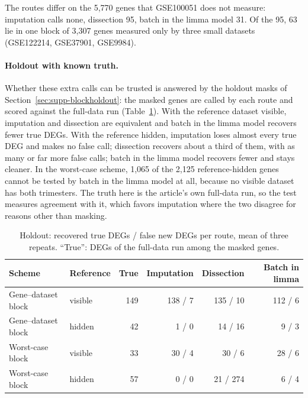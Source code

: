 \documentclass[11pt,a4paper]{article}
\begin{document}
The routes differ on the 5{,}770 genes that GSE100051 does not
measure: imputation calls none, dissection 95, batch in the limma
model 31. Of the 95, 63 lie in one block of 3{,}307 genes measured
only by three small datasets (GSE122214, GSE37901, GSE9984).

\paragraph{Holdout with known truth.}
Whether these extra calls can be trusted is answered by the
holdout masks of Section~\ref{sec:supp-blockholdout}: the masked
genes are called by each route and scored against the full-data
run (Table~\ref{tab:supp-routes-holdout}). With the reference
dataset visible, imputation and dissection are equivalent and
batch in the limma model recovers fewer true DEGs. With the
reference hidden, imputation loses almost every true DEG and makes
no false call; dissection recovers about a third of them, with as
many or far more false calls; batch in the limma model recovers
fewer and stays cleaner. In the worst-case scheme, 1{,}065 of the
2{,}125 reference-hidden genes cannot be tested by batch in the
limma model at all, because no visible dataset has both
trimesters. The truth here is the article's own full-data run, so
the test measures agreement with it, which favors imputation
where the two disagree for reasons other than masking.

\begin{table}[htbp]
\centering
\caption{Holdout: recovered true DEGs / false new DEGs per route,
  mean of three repeats. ``True'': DEGs of the full-data run among
  the masked genes.}
\label{tab:supp-routes-holdout}
\begin{tabular}{llrrrr}
\toprule
Scheme & Reference & True & Imputation & Dissection & Batch in limma \\
\midrule
Gene--dataset block & visible & 149 & 138 / 7 & 135 / 10 & 112 / 6 \\
Gene--dataset block & hidden  &  42 &   1 / 0 &  14 / 16 &   9 / 3 \\
Worst-case block    & visible &  33 &  30 / 4 &  30 / 6  &  28 / 6 \\
Worst-case block    & hidden  &  57 &   0 / 0 &  21 / 274 &  6 / 4 \\
\bottomrule
\end{tabular}
\end{table}
\end{document}
